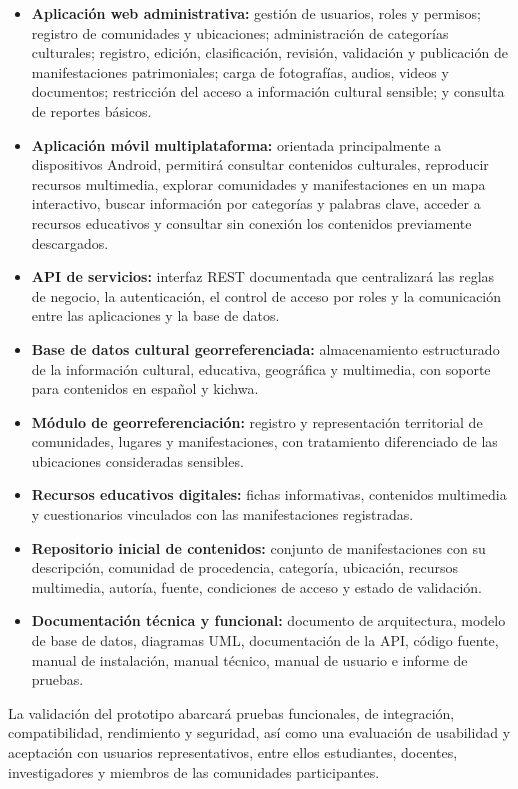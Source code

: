 \begin{itemize}
  \item \textbf{Aplicación web administrativa:} gestión de usuarios, roles y permisos; registro de comunidades y ubicaciones; administración de categorías culturales; registro, edición, clasificación, revisión, validación y publicación de manifestaciones patrimoniales; carga de fotografías, audios, videos y documentos; restricción del acceso a información cultural sensible; y consulta de reportes básicos.
  \item \textbf{Aplicación móvil multiplataforma:} orientada principalmente a dispositivos Android, permitirá consultar contenidos culturales, reproducir recursos multimedia, explorar comunidades y manifestaciones en un mapa interactivo, buscar información por categorías y palabras clave, acceder a recursos educativos y consultar sin conexión los contenidos previamente descargados.
  \item \textbf{API de servicios:} interfaz REST documentada que centralizará las reglas de negocio, la autenticación, el control de acceso por roles y la comunicación entre las aplicaciones y la base de datos.
  \item \textbf{Base de datos cultural georreferenciada:} almacenamiento estructurado de la información cultural, educativa, geográfica y multimedia, con soporte para contenidos en español y kichwa.
  \item \textbf{Módulo de georreferenciación:} registro y representación territorial de comunidades, lugares y manifestaciones, con tratamiento diferenciado de las ubicaciones consideradas sensibles.
  \item \textbf{Recursos educativos digitales:} fichas informativas, contenidos multimedia y cuestionarios vinculados con las manifestaciones registradas.
  \item \textbf{Repositorio inicial de contenidos:} conjunto de manifestaciones con su descripción, comunidad de procedencia, categoría, ubicación, recursos multimedia, autoría, fuente, condiciones de acceso y estado de validación.
  \item \textbf{Documentación técnica y funcional:} documento de arquitectura, modelo de base de datos, diagramas UML, documentación de la API, código fuente, manual de instalación, manual técnico, manual de usuario e informe de pruebas.
\end{itemize}

La validación del prototipo abarcará pruebas funcionales, de integración, compatibilidad, rendimiento y seguridad, así como una evaluación de usabilidad y aceptación con usuarios representativos, entre ellos estudiantes, docentes, investigadores y miembros de las comunidades participantes.

